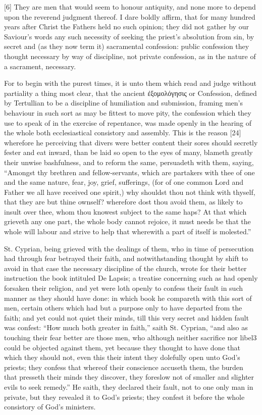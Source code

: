 [6] They are men that would seem to honour antiquity, and none more to depend upon the reverend judgment thereof. I dare boldly affirm, that for many hundred years after Christ the Fathers held no such opinion; they did not gather by our Saviour’s words any such necessity of seeking the priest’s absolution from sin, by secret and (as they now term it) sacramental confession: public confession they thought necessary by way of discipline, not private confession, as in the nature of a sacrament, necessary.

For to begin with the purest times, it is unto them which read and judge without partiality a thing most clear, that the ancient ἐξομολόγησις or Confession, defined by Tertullian to be a discipline of humiliation and submission, framing men’s behaviour in such sort as may be fittest to move pity, the confession which they use to speak of in the exercise of repentance, was made openly in the hearing of the whole both ecclesiastical consistory and assembly. This is the reason [24] wherefore he perceiving that divers were better content their sores should secretly fester and eat inward, than be laid so open to the eyes of many, blameth greatly their unwise bashfulness, and to reform the same, persuadeth with them, saying, “Amongst thy brethren and fellow-servants, which are partakers with thee of one and the same nature, fear, joy, grief, sufferings, (for of one common Lord and Father we all have received one spirit,) why shouldst thou not think with thyself, that they are but thine ownself? wherefore dost thou avoid them, as likely to insult over thee, whom thou knowest subject to the same haps? At that which grieveth any one part, the whole body cannot rejoice, it must needs be that the whole will labour and strive to help that wherewith a part of itself is molested.”

St. Cyprian, being grieved with the dealings of them, who in time of persecution had through fear betrayed their faith, and notwithstanding thought by shift to avoid in that case the necessary discipline of the church, wrote for their better instruction the book intituled De Lapsis; a treatise concerning such as had openly forsaken their religion, and yet were loth openly to confess their fault in such manner as they should have done: in which book he compareth with this sort of men, certain others which had but a purpose only to have departed from the faith; and yet could not quiet their minds, till this very secret and hidden fault was confest: “How much both greater in faith,” saith St. Cyprian, “and also as touching their fear better are those men, who although neither sacrifice nor libel3 could be objected against them, yet because they thought to have done that which they should not, even this their intent they dolefully open unto God’s priests; they confess that whereof their conscience accuseth them, the burden that presseth their minds they discover, they foreslow not of smaller and slighter evils to seek remedy.” He saith, they declared their fault, not to one only man in private, but they revealed it to God’s priests; they confest it before the whole consistory of God’s ministers.

